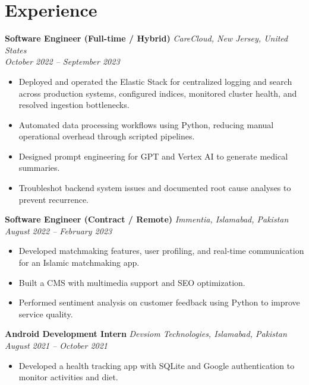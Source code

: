 \documentclass[a4paper,11pt]{article}
\begin{document}
\section*{Experience}

\textbf{Software Engineer (Full-time / Hybrid)} \hfill \textit{CareCloud, New Jersey, United States} \\
\textit{October 2022 -- September 2023}
\begin{itemize}[leftmargin=*, noitemsep, nolistsep]
    \item Deployed and operated the Elastic Stack for centralized logging and search across production systems, configured indices, monitored cluster health, and resolved ingestion bottlenecks.
    \item Automated data processing workflows using Python, reducing manual operational overhead through scripted pipelines.
    \item Designed prompt engineering for GPT and Vertex AI to generate medical summaries.
    \item Troubleshot backend system issues and documented root cause analyses to prevent recurrence.
\end{itemize}

\textbf{Software Engineer (Contract / Remote)} \hfill \textit{Immentia, Islamabad, Pakistan} \\
\textit{August 2022 -- February 2023}
\begin{itemize}[leftmargin=*, noitemsep, nolistsep]
    \item Developed matchmaking features, user profiling, and real-time communication for an Islamic matchmaking app.
    \item Built a CMS with multimedia support and SEO optimization.
    \item Performed sentiment analysis on customer feedback using Python to improve service quality.
\end{itemize}

\textbf{Android Development Intern} \hfill \textit{Devsiom Technologies, Islamabad, Pakistan} \\
\textit{August 2021 -- October 2021}
\begin{itemize}[leftmargin=*, noitemsep, nolistsep]
    \item Developed a health tracking app with SQLite and Google authentication to monitor activities and diet.
\end{itemize}
\end{document}
